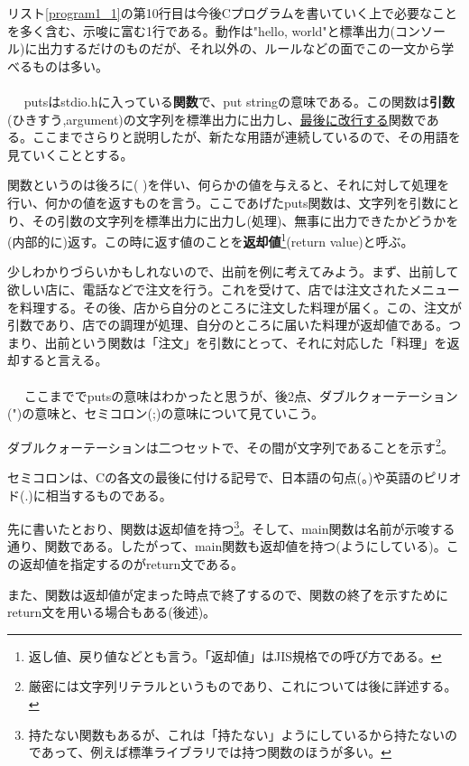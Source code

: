 リスト\ref{program1_1}の第10行目は今後Cプログラムを書いていく上で必要なことを多く含む、示唆に富む1行である。動作は"hello, world"と標準出力(コンソール)に出力するだけのものだが、それ以外の、ルールなどの面でこの一文から学べるものは多い。
\\ \\　
putsはstdio.hに入っている\textbf{関数}で、put stringの意味である。この関数は\textbf{引数}(ひきすう,argument)の文字列を標準出力に出力し、\underline{最後に改行する}関数である。ここまでさらりと説明したが、新たな用語が連続しているので、その用語を見ていくこととする。

関数というのは後ろに( )を伴い、何らかの値を与えると、それに対して処理を行い、何かの値を返すものを言う。ここであげたputs関数は、文字列を引数にとり、その引数の文字列を標準出力に出力し(処理)、無事に出力できたかどうかを(内部的に)返す。この時に返す値のことを\textbf{返却値}\footnote{返し値、戻り値などとも言う。「返却値」はJIS規格での呼び方である。}(return value)と呼ぶ。

少しわかりづらいかもしれないので、出前を例に考えてみよう。まず、出前して欲しい店に、電話などで注文を行う。これを受けて、店では注文されたメニューを料理する。その後、店から自分のところに注文した料理が届く。この、注文が引数であり、店での調理が処理、自分のところに届いた料理が返却値である。つまり、出前という関数は「注文」を引数にとって、それに対応した「料理」を返却すると言える。
\\ \\　
ここまででputsの意味はわかったと思うが、後2点、ダブルクォーテーション(")の意味と、セミコロン(;)の意味について見ていこう。

ダブルクォーテーションは二つセットで、その間が文字列であることを示す\footnote{厳密には文字列リテラルというものであり、これについては後に詳述する。}。

セミコロンは、Cの各文の最後に付ける記号で、日本語の句点(。)や英語のピリオド(.)に相当するものである。

先に書いたとおり、関数は返却値を持つ\footnote{持たない関数もあるが、これは「持たない」ようにしているから持たないのであって、例えば標準ライブラリでは持つ関数のほうが多い。}。そして、main関数は名前が示唆する通り、関数である。したがって、main関数も返却値を持つ(ようにしている)。この返却値を指定するのがreturn文である。

また、関数は返却値が定まった時点で終了するので、関数の終了を示すためにreturn文を用いる場合もある(後述)。

